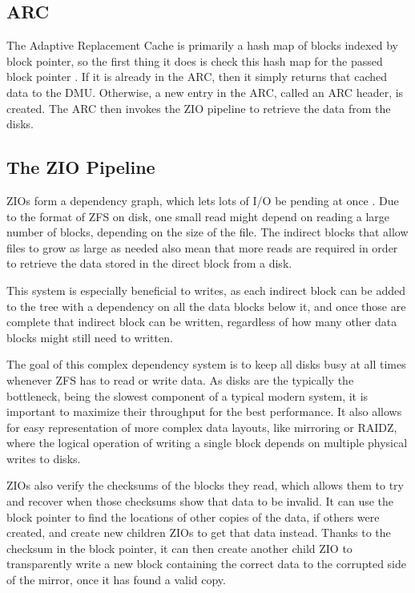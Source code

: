 \subsection{ARC}
The Adaptive Replacement Cache is primarily a hash map of blocks indexed by block pointer, 
so the first thing it does is check this hash map for the passed block pointer
\cite{ahrens_read_write,zfs}.
If it is already in the ARC, then it simply returns that cached data to the DMU.
Otherwise, a new entry in the ARC, called an ARC header, is created.
The ARC then invokes the ZIO pipeline to retrieve the data from the disks.

\subsection{The ZIO Pipeline}
ZIOs form a dependency graph, which lets lots of I/O be pending at once \cite{ahrens_read_write}. 
Due to the format of ZFS on disk, one small read might depend on reading a large number of blocks, 
depending on the size of the file.
The indirect blocks that allow files to grow as large as needed also mean that more reads are required 
in order to retrieve the data stored in the direct block from a disk.

This system is especially beneficial to writes, as each indirect block can be added to the tree with a dependency on 
all the data blocks below it, and once those are complete
that indirect block can be written, regardless of how many other data blocks might still need to written.

The goal of this complex dependency system is to keep all disks busy at all times whenever ZFS has to read or write data.
As disks are the typically the bottleneck, being the slowest component of a typical modern system,
it is important to maximize their throughput for the best performance.
It also allows for easy representation of more complex data layouts, like mirroring or RAIDZ, 
where the logical operation of writing a single block depends on multiple physical writes to disks.

ZIOs also verify the checksums of the blocks they read, 
which allows them to try and recover when those checksums show that data to be invalid.
It can use the block pointer to find the locations of other copies of the data, if others were created, 
and create new children ZIOs to get that data instead.
Thanks to the checksum in the block pointer, it can then create another child ZIO to transparently write a new block
containing the correct data to the corrupted side of the mirror, once it has found a valid copy.

